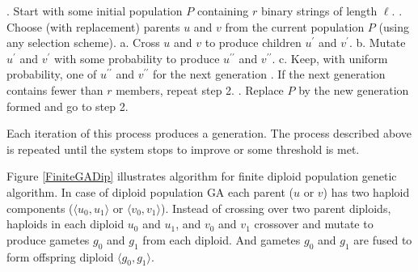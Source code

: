 \begin{algorithm}
\caption*{}
\begin{algorithmic}[1]
. Start with some initial population $P$ containing $r$ binary strings of length $\ell$.
. Choose (with replacement) parents $u$ and $v$ from the current population $P$ (using any selection scheme).
  \Statex \hspace{\algorithmicindent} a. Cross $u$ and $v$ to produce children $u^\prime$ and $v^\prime$.
  \Statex \hspace{\algorithmicindent} b. Mutate $u^\prime$ and $v^\prime$ with some probability to produce $u^{\prime\prime}$ and $v^{\prime\prime}$.
  \Statex \hspace{\algorithmicindent} c. Keep, with uniform probability, one of $u^{\prime\prime}$ and $v^{\prime\prime}$ for the next generation 
. If the next generation contains fewer than $r$ members, repeat step 2.
. Replace $P$ by the new generation formed and go to step 2.
\end{algorithmic}
\label{RealGA}
\end{algorithm}

Each iteration of this process produces a generation. 
The process described above is repeated until the system stops to improve or some threshold is met. 

Figure \ref{FiniteGADip} illustrates 
algorithm for finite diploid population genetic algorithm. 
In case of diploid population GA each parent ($u$ or $v$) 
has two haploid components ($\langle u_0, u_1 \rangle$ or $\langle v_0, v_1 \rangle$). 
Instead of crossing over two parent diploids, 
haploids in each diploid $u_0$ and $u_1$, and $v_0$ and $v_1$ 
crossover and mutate to produce gametes $g_0$ and $g_1$ from  each diploid. 
And gametes $g_0$ and $g_1$ are fused to form offspring diploid $ \langle g_0, g_1 \rangle $.

